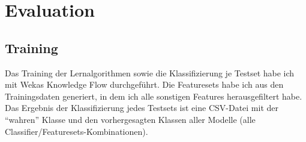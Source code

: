 \chapter{Evaluation}

\section{Training}
Das Training der Lernalgorithmen sowie die Klassifizierung je Testset habe ich mit Wekas Knowledge Flow durchgeführt. Die Featuresets habe ich aus den Trainingsdaten generiert, in dem ich alle sonstigen Features herausgefiltert habe. Das Ergebnis der Klassifizierung jedes Testsets ist eine CSV-Datei mit der \enquote{wahren} Klasse und den vorhergesagten Klassen aller Modelle (alle Classifier/Featuresets-Kombinationen).\\
